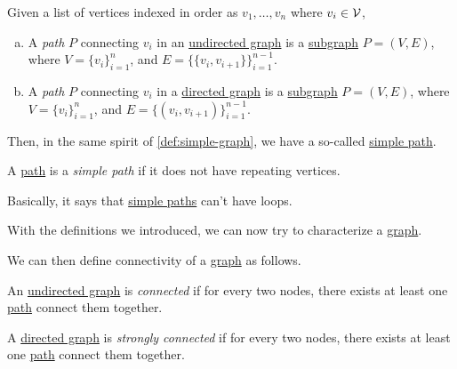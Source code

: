 \begin{definition}[Path]\label{def:path}
	Given a list of vertices indexed in order as \(v_1, \ldots , v_n\) where \(v_i\in \mathcal{\MakeUppercase{v}} \),
	\begin{enumerate}[(a)]
		\item A \emph{path} \(P\) connecting \(v_i\) in an \hyperref[def:undirected-graph]{undirected graph} is a \hyperref[def:subgraph]{subgraph} \(P = (V, E)\), where \(V=\{v_i\}_{i=1}^n\), and
		      \(E = \{\{v_i, v_{i+1}\}\}_{i = 1}^{n-1}\).
		\item A \emph{path} \(P\) connecting \(v_i\) in a \hyperref[def:directed-graph]{directed graph} is a \hyperref[def:subgraph]{subgraph} \(P = (V, E)\), where \(V=\{v_i\}_{i=1}^n\), and
		      \(E = \{(v_i, v_{i+1})\}_{i = 1}^{n-1}\).
	\end{enumerate}
\end{definition}

Then, in the same spirit of \autoref{def:simple-graph}, we have a so-called \hyperref[def:simple-path]{simple path}.
\begin{definition}\label{def:simple-path}
	A \hyperref[def:path]{path} is a \emph{simple path} if it does not have repeating vertices.
\end{definition}
\begin{intuition}
	Basically, it says that \hyperref[def:simple-path]{simple paths} can't have loops.
\end{intuition}

With the definitions we introduced, we can now try to characterize a \hyperref[def:graph]{graph}.

\begin{definition*}
	We can then define connectivity of a \hyperref[def:graph]{graph} as follows.
	\begin{definition}[Connected]\label{def:connected}
		An \hyperref[def:undirected-graph]{undirected graph} is \emph{connected} if for every two nodes, there exists at least one \hyperref[def:path]{path} connect them together.
	\end{definition}

	\begin{definition}\label{def:strongly-connected}
		A \hyperref[def:directed-graph]{directed graph} is \emph{strongly connected} if for every two nodes, there exists at least one \hyperref[def:path]{path} connect them together.
	\end{definition}
\end{definition*}

